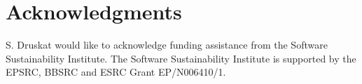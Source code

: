 \documentclass[11pt,letterpaper]{article}
\newcommand{\katznote}[1]{ {\textcolor{magenta}    { ***Dan: #1 }}}
\begin{document}
\section*{Acknowledgments} \label{sec:acks}

S. Druskat would like to acknowledge funding assistance from the Software Sustainability Institute. The Software Sustainability Institute is supported by the EPSRC, BBSRC and ESRC Grant EP/N006410/1.



\newpage



\end{document}
